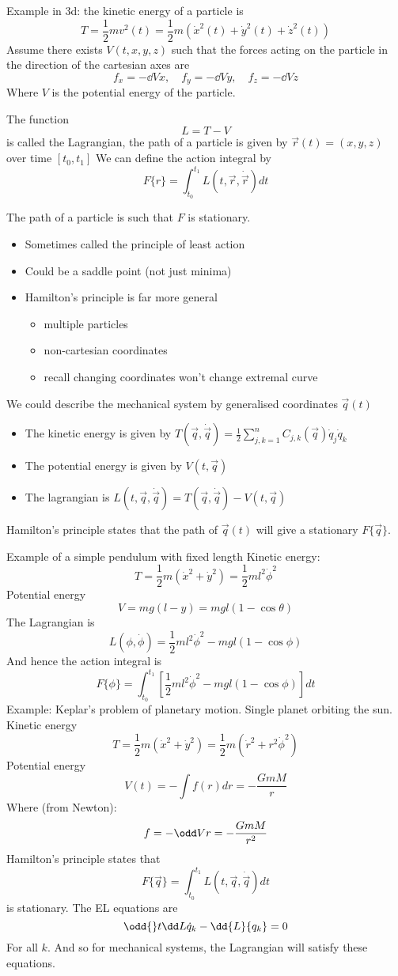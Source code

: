 \documentclass{X:/Documents/Coding/Latex/myassignment}
\begin{document}
Example in 3d: the kinetic energy of a particle is
\[T = \frac12 mv^2(t) = \frac12 m \left(\dot x^2(t) + \dot y^2(t) + \dot z^2(t)\right)\]
Assume there exists $V(t,x,y,z)$ such that the forces acting on the particle in the direction of the cartesian axes are
\[f_x = -\dd Vx, \quad f_y = -\dd Vy, \quad f_z = -\dd Vz\]
Where $V$ is the potential energy of the particle.

The function
\[L = T-V\]
is called the Lagrangian, the path of a particle is given by $\vec r(t) = (x,y,z)$ over time $[t_0,t_1]$
We can define the action integral by
\[F\{r\} = \int_{t_0}^{t_1} L(t,\vec r,\dot{\vec r}) dt\]

The path of a particle is such that $F$ is stationary.
\begin{itemize}
	\item Sometimes called the principle of least action
	\item Could be a saddle point (not just minima)
	\item Hamilton's principle is far more general
	\begin{itemize}
		\item multiple particles
		\item non-cartesian coordinates
		\item recall changing coordinates won't change extremal curve
	\end{itemize}
\end{itemize}

We could describe the mechanical system by generalised coordinates $\vec q(t)$
\begin{itemize}
	\item The kinetic energy is given by $T(\vec q, \dot{\vec q}) = \frac12 \sum_{j,k=1}^n C_{j,k} (\vec q) \dot{q}_j \dot {q}_k$
	\item The potential energy is given by $V(t,\vec q)$
	\item The lagrangian is $L(t,\vec q,\dot{\vec q}) = T(\vec q,\dot{\vec q}) - V(t,\vec q)$
\end{itemize}
Hamilton's principle states that the path of $\vec q(t)$ will give a stationary $F\{\vec q\}$.

Example of a simple pendulum with fixed length
Kinetic energy:
\[T = \frac12 m(\dot x^2 + \dot y^2) = \frac12 m l^2 \dot \phi ^2\]
Potential energy
\[V = mg(l-y) = mgl(1-\cos\theta)\]
The Lagrangian is
\[L(\phi,\dot\phi) = \frac12 ml^2 \dot\phi^2 - mgl(1-\cos\phi)\]
And hence the action integral is
\[F\{\phi\} = \int_{t_0}^{t_1} \left[\frac12 ml^2\dot\phi^2 - mgl(1-\cos\phi)\right] dt\]
Example: Keplar's problem of planetary motion.
Single planet orbiting the sun.
Kinetic energy
\[T = \frac12 m \left(\dot x^2 + \dot y^2\right) = \frac12 m (\dot r^2 + r^2\dot\phi^2)\]
Potential energy
\[V(t) = -\int f(r) dr = -\frac{GmM}{r}\]
Where (from Newton):
\[f = -\odd Vr = -\frac{GmM}{r^2}\]
Hamilton's principle states that 
\[F\{\vec q\} = \int_{t_0}^{t_1} L(t,\vec q,\dot{\vec q}) dt\]
is stationary.
The EL equations are
\[\odd{}t \dd L{\dot q_k} - \dd{L}{q_k} = 0\]
For all $k$. And so for mechanical systems, the Lagrangian will satisfy these equations.
\end{document}
